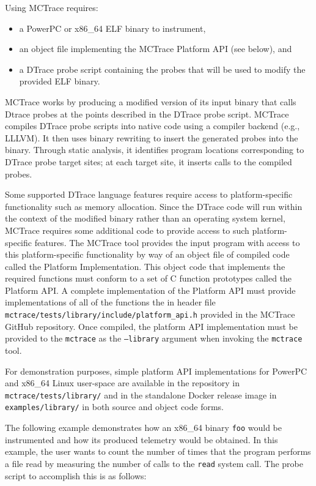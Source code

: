 Using MCTrace requires:
\begin{itemize}
\item a PowerPC or x86\_64 ELF binary to instrument,
\item an object file implementing the MCTrace Platform API (see below), and
\item a DTrace probe script containing the probes that will be used to
  modify the provided ELF binary.
\end{itemize}

MCTrace works by producing a modified version of its input binary that
calls Dtrace probes at the points described in the DTrace probe script.
MCTrace compiles DTrace probe scripts into native code using a compiler
backend (e.g., LLLVM). It then uses binary rewriting to insert the
generated probes into the binary. Through static analysis, it identifies
program locations corresponding to DTrace probe target sites; at each
target site, it inserts calls to the compiled probes.

Some supported DTrace language features require access to
platform-specific functionality such as memory allocation. Since the
DTrace code will run within the context of the modified binary rather
than an operating system kernel, MCTrace requires some additional code
to provide access to such platform-specific features. The MCTrace tool
provides the input program with access to this platform-specific
functionality by way of an object file of compiled code called the
Platform Implementation. This object code that implements the required
functions must conform to a set of C function prototypes called the
Platform API. A complete implementation of the Platform API must provide
implementations of all of the functions the in header file
\texttt{mctrace/tests/library/include/platform\_api.h} provided in the MCTrace
GitHub repository. Once compiled, the platform API implementation must
be provided to the \texttt{mctrace} as the \texttt{--library} argument when invoking
the \texttt{mctrace} tool.

For demonstration purposes, simple platform API implementations for
PowerPC and x86\_64 Linux user-space are available in the repository
in \texttt{mctrace/tests/library/} and in the standalone Docker release image in
\texttt{examples/library/} in both source and object code forms.

The following example demonstrates how an x86\_64 binary
  \texttt{foo} would be instrumented and how its produced telemetry
  would be obtained. In this example, the user wants to count the number
  of times that the program performs a file read by measuring the number
  of calls to the \texttt{read} system call. The probe script to
    accomplish this is as follows:

